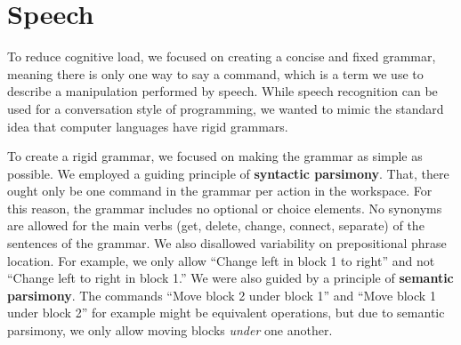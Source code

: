 \documentclass[]{article}
\begin{document}
\section{Speech}


To reduce cognitive load, we focused on creating a concise and fixed grammar, 
meaning there is only one way to say a command, which is a term we use to 
describe a manipulation performed by speech. While speech recognition can be 
used for a conversation style of programming, we wanted to mimic the standard 
idea that computer languages have rigid grammars. 


To create a rigid grammar, we focused on making the grammar as simple as
possible. We employed a guiding principle of \textbf{syntactic parsimony}. That,
there ought only be one command in the grammar per action in the workspace. For
this reason, the grammar includes no optional or choice elements. No synonyms
are allowed for the main verbs (get, delete, change, connect, separate) of the
sentences of the grammar. We also disallowed variability on prepositional phrase
location. For example, we only allow ``Change left in block 1 to right'' and not
``Change left to right in block 1.'' We were also guided by a principle of
\textbf{semantic parsimony}. The commands ``Move block 2 under block 1'' and
``Move block 1 under block 2'' for example might be equivalent operations, but
due to semantic parsimony, we only allow moving blocks \emph{under} one another.

\end{document}
